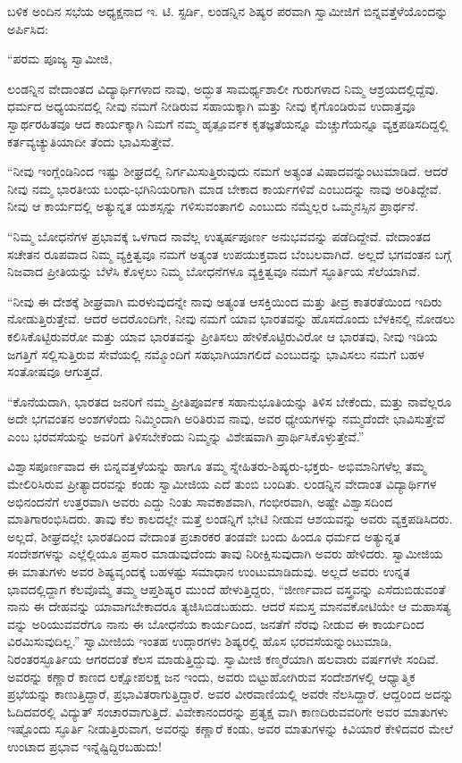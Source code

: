 ಬಳಿಕ ಅಂದಿನ ಸಭೆಯ ಅಧ್ಯಕ್ಷನಾದ ಇ. ಟಿ. ಸ್ಟರ್ಡಿ, ಲಂಡನ್ನಿನ ಶಿಷ್ಯರ ಪರವಾಗಿ ಸ್ವಾಮೀಜಿಗೆ ಬಿನ್ನವತ್ತೆಳೆಯೊಂದನ್ನು ಅರ್ಪಿಸಿದ:

“ಪರಮ ಪೂಜ್ಯ ಸ್ವಾಮೀಜಿ,

ಲಂಡನ್ನಿನ ವೇದಾಂತದ ವಿದ್ಯಾರ್ಥಿಗಳಾದ ನಾವು, ಅದ್ಭುತ ಸಾಮರ್ಥ್ಯಶಾಲೀ ಗುರುಗಳಾದ ನಿಮ್ಮ ಆಶ್ರಯದಲ್ಲಿದ್ದೆವು. ಧರ್ಮದ ಅಧ್ಯಯನದಲ್ಲಿ ನೀವು ನಮಗೆ ನೀಡಿರುವ ಸಹಾಯಕ್ಕಾಗಿ ಮತ್ತು ನೀವು ಕೈಗೊಂಡಿರುವ ಉದಾತ್ತವೂ ಸ್ವಾರ್ಥರಹಿತವೂ ಆದ ಕಾರ್ಯಕ್ಕಾಗಿ ನಿಮಗೆ ನಮ್ಮ ಹೃತ್ಪೂರ್ವಕ ಕೃತಜ್ಞತೆಯನ್ನೂ ಮೆಚ್ಚುಗೆಯನ್ನೂ ವ್ಯಕ್ತಪಡಿಸದಿದ್ದಲ್ಲಿ ಕರ್ತವ್ಯಚ್ಯುತಿಯಾದೀ ತೆಂದು ಭಾವಿಸುತ್ತೇವೆ.

“ನೀವು ಇಂಗ್ಲೆಂಡಿನಿಂದ ಇಷ್ಟು ಶೀಘ್ರದಲ್ಲಿ ನಿರ್ಗಮಿಸುತ್ತಿರುವುದು ನಮಗೆ ಅತ್ಯಂತ ವಿಷಾದವನ್ನುಂಟುಮಾಡಿದೆ. ಆದರೆ ನೀವು ನಮ್ಮ ಭಾರತೀಯ ಬಂಧು-ಭಗಿನಿಯರಿಗಾಗಿ ಮಾಡ ಬೇಕಾದ ಕಾರ್ಯಗಳಿವೆ ಎಂಬುದನ್ನು ನಾವು ಅರಿತಿದ್ದೇವೆ. ನೀವು ಆ ಕಾರ್ಯದಲ್ಲಿ ಅತ್ಯುನ್ನತ ಯಶಸ್ಸನ್ನು ಗಳಿಸುವಂತಾಗಲಿ ಎಂಬುದು ನಮ್ಮೆಲ್ಲರ ಒಮ್ಮನಸ್ಸಿನ ಪ್ರಾರ್ಥನೆ.

“ನಿಮ್ಮ ಬೋಧನೆಗಳ ಪ್ರಭಾವಕ್ಕೆ ಒಳಗಾದ ನಾವೆಲ್ಲ ಉತ್ಕರ್ಷಪೂರ್ಣ ಅನುಭವವನ್ನು ಪಡೆದಿದ್ದೇವೆ. ವೇದಾಂತದ ಸಚೇತನ ರೂಪವಾದ ನಿಮ್ಮ ವ್ಯಕ್ತಿತ್ವವೂ ನಮಗೆ ಅತ್ಯಂತ ಉಪಯುಕ್ತವಾದ ಬೆಂಬಲವಾಗಿದೆ. ಅಲ್ಲದೆ ಭಗವಂತನ ಬಗ್ಗೆ ನಿಜವಾದ ಪ್ರೀತಿಯನ್ನು ಬೆಳೆಸಿ ಕೊಳ್ಳಲು ನಿಮ್ಮ ಬೋಧನೆಗಳೂ ವ್ಯಕ್ತಿತ್ವವೂ ನಮಗೆ ಸ್ಫೂರ್ತಿಯ ಸೆಲೆಯಾಗಿವೆ.

“ನೀವು ಈ ದೇಶಕ್ಕೆ ಶೀಘ್ರವಾಗಿ ಮರಳುವುದನ್ನೇ ನಾವು ಅತ್ಯಂತ ಆಸಕ್ತಿಯಿಂದ ಮತ್ತು ತೀವ್ರ ಕಾತರತೆಯಿಂದ ಇದಿರು ನೋಡುತ್ತಿರುತ್ತೇವೆ. ಆದರೆ ಅದರೊಂದಿಗೇ, ನೀವು ನಮಗೆ ಯಾವ ಭಾರತವನ್ನು ಹೊಸದೊಂದು ಬೆಳಕಿನಲ್ಲಿ ನೋಡಲು ಕಲಿಸಿಕೊಟ್ಟಿರುವರೋ ಮತ್ತು ಯಾವ ಭಾರತವನ್ನು ಪ್ರೀತಿಸಲು ಹೇಳಿಕೊಟ್ಟಿರುವಿರೋ ಆ ಭಾರತವು, ನೀವು ಇಡಿಯ ಜಗತ್ತಿಗೆ ಸಲ್ಲಿಸುತ್ತಿರುವ ಸೇವೆಯಲ್ಲಿ ನಮ್ಮೊಂದಿಗೆ ಸಹಭಾಗಿಯಾಗಲಿದೆ ಎಂಬುದನ್ನು ಭಾವಿಸಲು ನಮಗೆ ಬಹಳ ಸಂತೋಷವೂ ಆಗುತ್ತದೆ.

“ಕೊನೆಯದಾಗಿ, ಭಾರತದ ಜನರಿಗೆ ನಮ್ಮ ಪ್ರೀತಿಪೂರ್ವಕ ಸಹಾನುಭೂತಿಯನ್ನು ತಿಳಿಸ ಬೇಕೆಂದು, ಮತ್ತು ನಾವೆಲ್ಲರೂ ಅದೇ ಭಗವಂತನ ಅಂಶಗಳೆಂದು ನಿಮ್ಮಿಂದಾಗಿ ಅರಿತಿರುವ ನಾವು, ಅವರ ಧ್ಯೇಯಗಳನ್ನು ನಮ್ಮದೆಂದೇ ಭಾವಿಸುತ್ತೇವೆ ಎಂಬ ಭರವಸೆಯನ್ನು ಅವರಿಗೆ ತಿಳಿಸಬೇಕೆಂದು ನಿಮ್ಮನ್ನು ವಿಶೇಷವಾಗಿ ಪ್ರಾರ್ಥಿಸಿಕೊಳ್ಳುತ್ತೇವೆ.”

ವಿಶ್ವಾಸಪೂರ್ಣವಾದ ಈ ಬಿನ್ನವತ್ತಳೆಯನ್ನು ಹಾಗೂ ತಮ್ಮ ಸ್ನೇಹಿತರು-ಶಿಷ್ಯರು-ಭಕ್ತರು- ಅಭಿಮಾನಿಗಳೆಲ್ಲ ತಮ್ಮ ಮೇಲಿರಿಸಿರುವ ಪ್ರೀತ್ಯಾದರವನ್ನು ಕಂಡು ಸ್ವಾಮೀಜಿಯ ಎದೆ ತುಂಬಿ ಬಂದಿತು. ಲಂಡನ್ನಿನ ವೇದಾಂತ ವಿದ್ಯಾರ್ಥಿಗಳ ಅಭಿನಂದನೆಗೆ ಉತ್ತರವಾಗಿ ಅವರು ಎದ್ದು ನಿಂತು ಸಾವಕಾಶವಾಗಿ, ಗಂಭೀರವಾಗಿ, ಅಷ್ಟೇ ವಿಶ್ವಾಸದಿಂದ ಮಾತಿಗಾರಂಭಿಸಿದರು. ತಾವು ಕೆಲ ಕಾಲದಲ್ಲೇ ಮತ್ತೆ ಲಂಡನ್ನಿಗೆ ಭೇಟಿ ನೀಡುವ ಆಶಯವನ್ನು ಅವರು ವ್ಯಕ್ತಪಡಿಸಿದರು. ಅಲ್ಲದೆ, ಶೀಘ್ರದಲ್ಲೇ ಭಾರತದಿಂದ ವೇದಾಂತ ಪ್ರಚಾರಕರ ತಂಡವೇ ಬಂದು ಹಿಂದೂ ಧರ್ಮದ ಅತ್ಯುನ್ನತ ಸಂದೇಶಗಳನ್ನು ಎಲ್ಲೆಲ್ಲಿಯೂ ಪ್ರಸಾರ ಮಾಡುವುದೆಂದು ತಾವು ನಿರೀಕ್ಷಿಸುವುದಾಗಿ ಅವರು ಹೇಳಿದರು. ಸ್ವಾಮೀಜಿಯ ಈ ಮಾತುಗಳು ಅವರ ಶಿಷ್ಯವೃಂದಕ್ಕೆ ಬಹಳಷ್ಟು ಸಮಾಧಾನ ಉಂಟುಮಾಡಿದುವು. ಅಲ್ಲದೆ ಅವರು ಉನ್ನತ ಭಾವದಲ್ಲಿದ್ದಾಗ ಕೆಲವೊಮ್ಮೆ ತಮ್ಮ ಆಪ್ತಶಿಷ್ಯರ ಮುಂದೆ ಹೇಳುತ್ತಿದ್ದರು, “ಜೀರ್ಣವಾದ ವಸ್ತ್ರವನ್ನು ಎಸೆದುಬಿಡುವಂತೆ ನಾನು ಈ ದೇಹವನ್ನು ಯಾವಾಗಬೇಕಾದರೂ ತ್ಯಜಿಸಿಬಿಡಬಹುದು. ಆದರೆ ಸಮಸ್ತ ಮಾನವಕೋಟಿಯೇ ಆ ಮಹಾಸತ್ಯ ವನ್ನು ಅರಿಯುವವರೆಗೂ ನಾನು ಈ ಬೋಧನೆಯ ಕಾರ್ಯದಿಂದ, ಜನತೆಗೆ ನೆರವು ನೀಡುವ ಈ ಕಾರ್ಯದಿಂದ ವಿರಮಿಸುವುದಿಲ್ಲ.” ಸ್ವಾಮೀಜಿಯ ಇಂತಹ ಉದ್ಗಾರಗಳು ಶಿಷ್ಯರಲ್ಲಿ ಹೊಸ ಭರವಸೆಯನ್ನುಂಟುಮಾಡಿ, ನಿರಂತರಸ್ಫೂರ್ತಿಯ ಆಗರದಂತೆ ಕೆಲಸ ಮಾಡುತ್ತಿದ್ದುವು. ಸ್ವಾಮೀಜಿ ಕಣ್ಮರೆಯಾಗಿ ಹಲವಾರು ವರ್ಷಗಳೇ ಸಂದಿವೆ. ಅವರನ್ನು ಕಣ್ಣಾರೆ ಕಾಣದ ಲಕ್ಷೋಪಲಕ್ಷ ಜನ ಇಂದು, ಅವರು ಬಿಟ್ಟುಹೋಗಿರುವ ಸಂದೇಶಗಳಲ್ಲಿ ಆಧ್ಯಾತ್ಮಿಕ ಪ್ರಭೆಯನ್ನು ಕಾಣುತ್ತಿದ್ದಾರೆ, ಪ್ರಭಾವಿತರಾಗುತ್ತಿದ್ದಾರೆ. ಅವರ ವೀರವಾಣಿಯಲ್ಲಿ ಅವರೇ ನೆಲಸಿದ್ದಾರೆ. ಆದ್ದರಿಂದ ಅದನ್ನು ಓದಿದವರಲ್ಲಿ ವಿದ್ಯುತ್ ಸಂಚಾರವಾಗುತ್ತಿದೆ. ವಿವೇಕಾನಂದರನ್ನು ಪ್ರತ್ಯಕ್ಷ ವಾಗಿ ಕಾಣದಿರುವವರಿಗೇ ಅವರ ಮಾತುಗಳು ಇಷ್ಟೊಂದು ಸ್ಫೂರ್ತಿ ನೀಡುತ್ತಿರುವಾಗ, ಅವರನ್ನು ಕಣ್ಣಾರೆ ಕಂಡು, ಅವರ ಮಾತುಗಳನ್ನು ಕಿವಿಯಾರೆ ಕೇಳಿದವರ ಮೇಲೆ ಉಂಟಾದ ಪ್ರಭಾವ ಇನ್ನೆಷ್ಟಿದ್ದಿರಬಹುದು!

